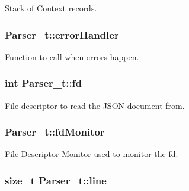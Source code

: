 Stack of Context records. 

\subsubsection[{\texorpdfstring{error\+Handler}{errorHandler}}]{ Parser\+\_\+t\+::error\+Handler}\hypertarget{struct_parser__t_a98153bde62ce24ba2ce458115e1f7841}{}\label{struct_parser__t_a98153bde62ce24ba2ce458115e1f7841}


Function to call when errors happen. 

\subsubsection[{\texorpdfstring{fd}{fd}}]{\setlength{\rightskip}{0pt plus 5cm}int Parser\+\_\+t\+::fd}\hypertarget{struct_parser__t_a5282cf2874fbbe79f73ce6f5f2e2cda6}{}\label{struct_parser__t_a5282cf2874fbbe79f73ce6f5f2e2cda6}


File descriptor to read the J\+S\+ON document from. 

\subsubsection[{\texorpdfstring{fd\+Monitor}{fdMonitor}}]{ Parser\+\_\+t\+::fd\+Monitor}\hypertarget{struct_parser__t_a4b75b18e2e7804554a6074e932183303}{}\label{struct_parser__t_a4b75b18e2e7804554a6074e932183303}


File Descriptor Monitor used to monitor the fd. 

\subsubsection[{\texorpdfstring{line}{line}}]{\setlength{\rightskip}{0pt plus 5cm}size\+\_\+t Parser\+\_\+t\+::line}\hypertarget{struct_parser__t_a6296b550b3a29a04377e32c37e18e281}{}\label{struct_parser__t_a6296b550b3a29a04377e32c37e18e281}


